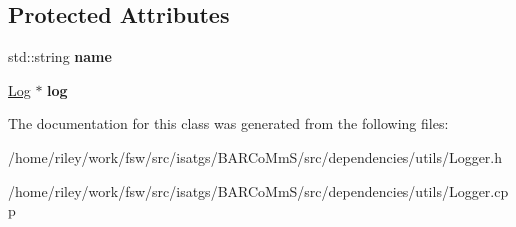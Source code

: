 \subsection*{Protected Attributes}
\begin{DoxyCompactItemize}
\item 
std\+::string {\bfseries name}\hypertarget{classisat__utils_1_1_logger_aa8d63198108fbc1a1c350b089057e1bb}{}\label{classisat__utils_1_1_logger_aa8d63198108fbc1a1c350b089057e1bb}

\item 
\hyperlink{classisat__utils_1_1_log}{Log} $\ast$ {\bfseries log}\hypertarget{classisat__utils_1_1_logger_ad0ecb0d69ae02127dd00e26cea47016f}{}\label{classisat__utils_1_1_logger_ad0ecb0d69ae02127dd00e26cea47016f}

\end{DoxyCompactItemize}


The documentation for this class was generated from the following files\+:\begin{DoxyCompactItemize}
\item 
/home/riley/work/fsw/src/isatgs/\+B\+A\+R\+Co\+Mm\+S/src/dependencies/utils/Logger.\+h\item 
/home/riley/work/fsw/src/isatgs/\+B\+A\+R\+Co\+Mm\+S/src/dependencies/utils/Logger.\+cpp\end{DoxyCompactItemize}

